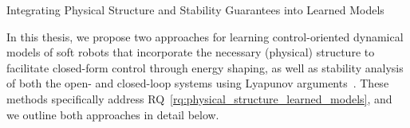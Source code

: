 \begin{contribution}\label{contrib:learned_models}
    Integrating Physical Structure and Stability Guarantees into Learned Models
\end{contribution}
In this thesis, we propose two approaches for learning control-oriented dynamical models of soft robots that incorporate the necessary (physical) structure to facilitate closed-form control through energy shaping, as well as stability analysis of both the open- and closed-loop systems using Lyapunov arguments~\citep{khalil2002nonlinear}. These methods specifically address \gls{RQ}~\ref{rq:physical_structure_learned_models}, and we outline both approaches in detail below.

